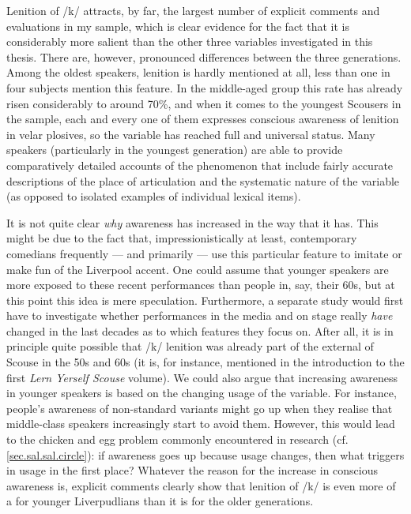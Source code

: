Lenition of /k/ attracts, by far, the largest number of explicit comments and evaluations in my sample, which is clear evidence for the fact that it is considerably more salient than the other three variables investigated in this thesis.
There are, however, pronounced differences between the three generations.
Among the oldest speakers, lenition is hardly mentioned at all, less than one in four subjects mention this feature.
In the middle-aged group this rate has already risen considerably to around 70\%, and when it comes to the youngest Scousers in the sample, each and every one of them expresses conscious awareness of lenition in velar plosives, so the variable has reached full and universal  status.
Many speakers (particularly in the youngest generation) are able to provide comparatively detailed accounts of the phenomenon that include fairly accurate descriptions of the place of articulation and the systematic nature of the variable (as opposed to isolated examples of individual lexical items).

It is not quite clear \emph{why} awareness has increased in the way that it has.
This might be due to the fact that, impressionistically at least, contemporary comedians frequently --- and primarily --- use this particular feature to imitate or make fun of the Liverpool accent.
One could assume that younger speakers are more exposed to these recent performances than people in, say, their 60s, but at this point this idea is mere speculation.
Furthermore, a separate study would first have to investigate whether performances in the media and on stage really \emph{have} changed in the last decades as to which features they focus on.
After all, it is in principle quite possible that /k/ lenition was already part of the external  of Scouse in the 50s and 60s (it is, for instance, mentioned in the introduction to the first \emph{Lern Yerself Scouse} volume).
We could also argue that increasing awareness in younger speakers is based on the changing usage of the variable.
For instance, people's awareness of non-standard variants might go up when they realise that middle-class speakers increasingly start to avoid them.
However, this would lead to the chicken and egg problem commonly encountered in  research (cf. \ref{sec.sal.sal.circle}): if awareness goes up because usage changes, then what triggers  in usage in the first place?
Whatever the reason for the increase in conscious awareness is, explicit comments clearly show that lenition of /k/ is even more of a  for younger Liverpudlians than it is for the older generations.

